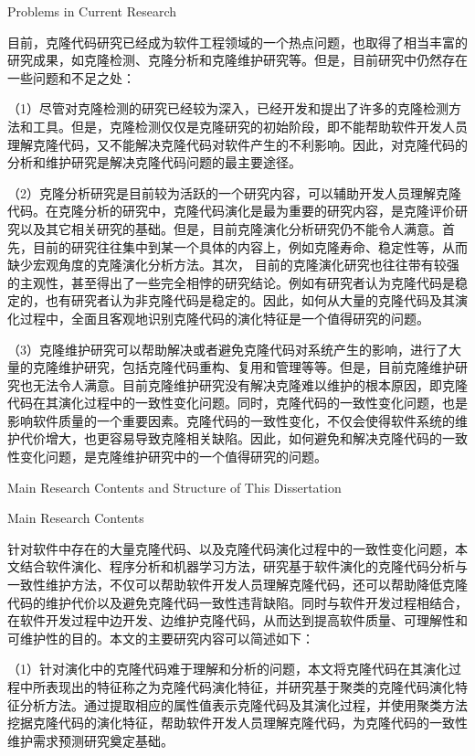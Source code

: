 {Problems in Current Research}

目前，克隆代码研究已经成为软件工程领域的一个热点问题，也取得了相当丰富的研究成果，如克隆检测、克隆分析和克隆维护研究等。但是，目前研究中仍然存在一些问题和不足之处：

（1）尽管对克隆检测的研究已经较为深入，已经开发和提出了许多的克隆检测方法和工具。但是，克隆检测仅仅是克隆研究的初始阶段，即不能帮助软件开发人员理解克隆代码，又不能解决克隆代码对软件产生的不利影响。因此，对克隆代码的分析和维护研究是解决克隆代码问题的最主要途径。

（2）克隆分析研究是目前较为活跃的一个研究内容，可以辅助开发人员理解克隆代码。在克隆分析的研究中，克隆代码演化是最为重要的研究内容，是克隆评价研究以及其它相关研究的基础。但是，目前克隆演化分析研究仍不能令人满意。首先，目前的研究往往集中到某一个具体的内容上，例如克隆寿命、稳定性等，从而缺少宏观角度的克隆演化分析方法。其次， 目前的克隆演化研究也往往带有较强的主观性，甚至得出了一些完全相悖的研究结论。例如有研究者认为克隆代码是稳定的，也有研究者认为非克隆代码是稳定的。因此，如何从大量的克隆代码及其演化过程中，全面且客观地识别克隆代码的演化特征是一个值得研究的问题。

（3）克隆维护研究可以帮助解决或者避免克隆代码对系统产生的影响，进行了大量的克隆维护研究，包括克隆代码重构、复用和管理等等。但是，目前克隆维护研究也无法令人满意。目前克隆维护研究没有解决克隆难以维护的根本原因，即克隆代码在其演化过程中的一致性变化问题。同时，克隆代码的一致性变化问题，也是影响软件质量的一个重要因素。克隆代码的一致性变化，不仅会使得软件系统的维护代价增大，也更容易导致克隆相关缺陷。因此，如何避免和解决克隆代码的一致性变化问题，是克隆维护研究中的一个值得研究的问题。

{Main Research Contents and Structure of This Dissertation}

{Main Research Contents}

针对软件中存在的大量克隆代码、以及克隆代码演化过程中的一致性变化问题，本文结合软件演化、程序分析和机器学习方法，研究基于软件演化的克隆代码分析与一致性维护方法，不仅可以帮助软件开发人员理解克隆代码，还可以帮助降低克隆代码的维护代价以及避免克隆代码一致性违背缺陷。同时与软件开发过程相结合，在软件开发过程中边开发、边维护克隆代码，从而达到提高软件质量、可理解性和可维护性的目的。本文的主要研究内容可以简述如下：

（1）针对演化中的克隆代码难于理解和分析的问题，本文将克隆代码在其演化过程中所表现出的特征称之为克隆代码演化特征，并研究基于聚类的克隆代码演化特征分析方法。通过提取相应的属性值表示克隆代码及其演化过程，并使用聚类方法挖据克隆代码的演化特征，帮助软件开发人员理解克隆代码，为克隆代码的一致性维护需求预测研究奠定基础。

